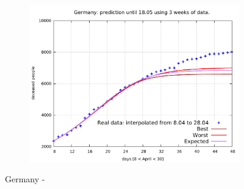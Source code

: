 \documentclass[8pt]{article}
\begin{document}
\begin{figure}[h!]
\begin{subfigure}[b]{0.45\linewidth}
  \includegraphics[width=\linewidth]{../simulations/de/8-28/8-28.pdf}
  \end{subfigure}
	\caption{Germany -}
\end{figure}
\end{document}

